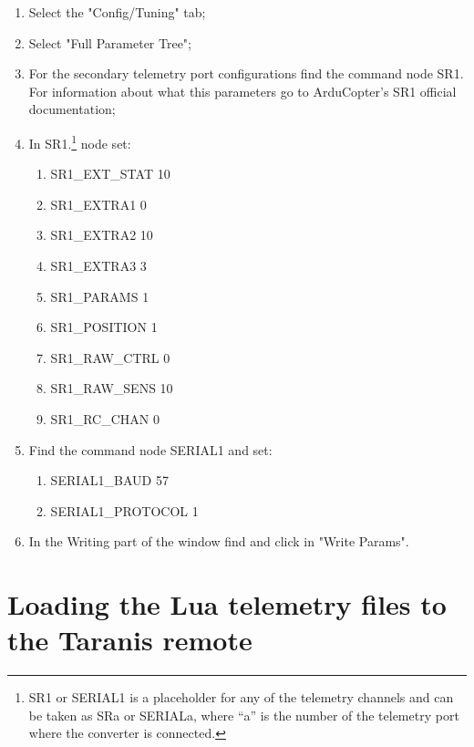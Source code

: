 \documentclass[english]{article}
\begin{document}
\begin{enumerate}

\item Select the "Config/Tuning" tab;
\item Select "Full Parameter Tree";
\item For the secondary telemetry port configurations find the command node SR1. For information about what this parameters go to ArduCopter’s SR1 official documentation;
\item In SR1.\footnote{SR1 or SERIAL1 is a placeholder for any of the telemetry channels and can be taken as SRa or SERIALa, where “a” is the number of the telemetry port where the converter is connected.
} node set:
\begin{enumerate}
\item SR1\_EXT\_STAT 10
\item SR1\_EXTRA1 0
\item SR1\_EXTRA2 10
\item SR1\_EXTRA3 3
\item SR1\_PARAMS 1
\item SR1\_POSITION 1
\item SR1\_RAW\_CTRL 0
\item SR1\_RAW\_SENS 10
\item SR1\_RC\_CHAN 0
\end{enumerate}


\item Find the command node SERIAL1 and set:
\begin{enumerate}
\item SERIAL1\_BAUD 57
\item SERIAL1\_PROTOCOL 1
\end{enumerate}
\item In the Writing part of the window find and click in "Write Params".

\end{enumerate}

\section{Loading the Lua telemetry files to the Taranis remote}
\end{document}

